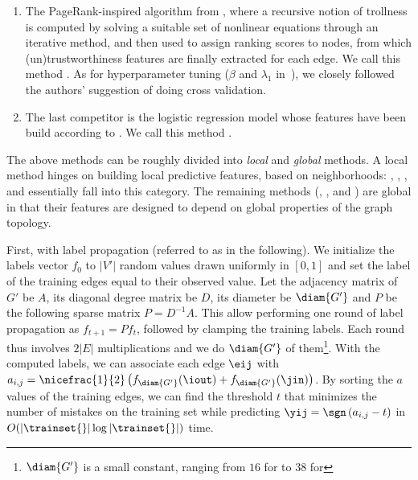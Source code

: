 \begin{enumerate}[label=\textbf{\arabic*.}]
  \item The PageRank-inspired algorithm from \autocite{wu2016troll}, where a recursive notion of
    trollness is computed by solving a suitable set of nonlinear equations through an iterative
    method, and then used to assign ranking scores to nodes, from which (un)trustworthiness features
    are finally extracted for each edge. We call this method \compranknodes{}. As for hyperparameter
    tuning ($\beta$ and $\lambda_1$ in~\autocite{wu2016troll}), we closely followed the authors'
    suggestion of doing cross validation.

  \item  The last competitor is the logistic regression model whose features have been build
    according to \autocite{Bayesian15}. We call this method \compbayesian{}.
\end{enumerate}

The above methods can be roughly divided into \emph{local} and \emph{global} methods. A local method
hinges on building local predictive features, based on neighborhoods: \usrule{}, \uslogregp{},
\comptriads{}, and \compbayesian{} essentially fall into this category. The remaining methods
(\uslpropGsec{}, \complowrank{}, and \compranknodes{}) are global in that their features are
designed to depend on global properties of the graph topology.

\iffalse
First, with label propagation (referred to as \uslprop{} in the following). We
initialize the labels vector $f_0$ to $|V'|$ random values drawn uniformly in
$[0, 1]$ and set the label of the training edges equal to their observed value.
Let the adjacency matrix of $G'$ be $A$, its diagonal degree matrix
be $D$, its diameter be $\diam{G'}$ and $P$ be the following sparse matrix $P=D^{-1}A$. This allow performing
one round of label propagation as $f_{t+1} = Pf_t$, followed by clamping the
training labels. Each round thus involves $2|E|$ multiplications and we do
$\diam{G'}$ of them\footnote{$\diam{G'}$ is a small constant, ranging from $16$
for \aut{} to $38$ for \epi{}}. With the computed labels, we can associate each
edge $\eij$ with $a_{i,j} = \nicefrac{1}{2}\left(f_{\diam{G'}}(\iout) +
f_{\diam{G'}}(\jin)\right)$.
By sorting the $a$ values of the training edges, we can find the threshold $t$
that minimizes the number of mistakes on the training set while predicting
$\yij = \sgn\left(a_{i,j} - t\right)$ in $O(|\trainset{}|\log |\trainset{}|)$
time.

